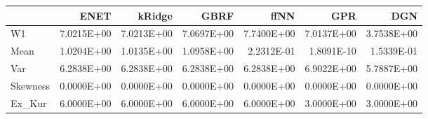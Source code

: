 \begin{tabular}{lrrrrrr}
\toprule
{} &       ENET &     kRidge &       GBRF &       ffNN &        GPR &        DGN \\
\midrule
W1       & 7.0215E+00 & 7.0213E+00 & 7.0697E+00 & 7.7400E+00 & 7.0137E+00 & 3.7538E+00 \\
Mean     & 1.0204E+00 & 1.0135E+00 & 1.0958E+00 & 2.2312E-01 & 1.8091E-10 & 1.5339E-01 \\
Var      & 6.2838E+00 & 6.2838E+00 & 6.2838E+00 & 6.2838E+00 & 6.9022E+00 & 5.7887E+00 \\
Skewness & 0.0000E+00 & 0.0000E+00 & 0.0000E+00 & 0.0000E+00 & 0.0000E+00 & 0.0000E+00 \\
Ex\_Kur   & 6.0000E+00 & 6.0000E+00 & 6.0000E+00 & 6.0000E+00 & 3.0000E+00 & 3.0000E+00 \\
\bottomrule
\end{tabular}
